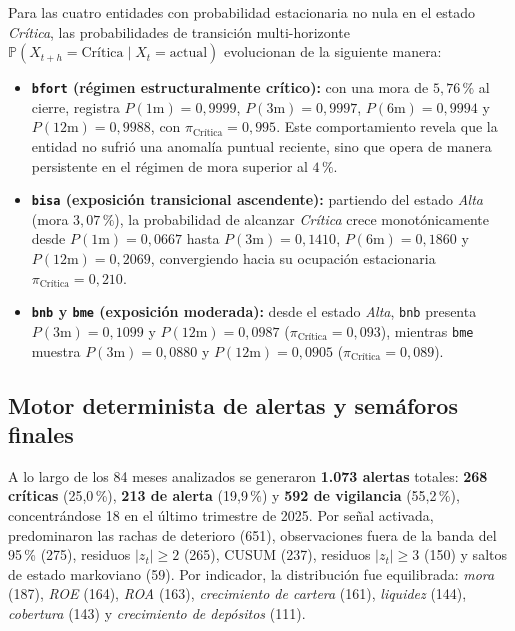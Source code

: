 \documentclass[11pt,letterpaper]{article}
\begin{document}
Para las cuatro entidades con probabilidad estacionaria no nula en el estado \emph{Crítica}, las probabilidades de transición multi-horizonte \(\mathbb{P}(X_{t+h} = \text{Crítica} \mid X_t = \text{actual})\) evolucionan de la siguiente manera:
\begin{itemize}[leftmargin=1.5em]
  \item \textbf{\texttt{bfort} (régimen estructuralmente crítico):} con una mora de \(5{,}76\,\%\) al cierre, registra \(P(1\text{m}) = 0{,}9999\), \(P(3\text{m}) = 0{,}9997\), \(P(6\text{m}) = 0{,}9994\) y \(P(12\text{m}) = 0{,}9988\), con \(\pi_{\text{Crítica}} = 0{,}995\). Este comportamiento revela que la entidad no sufrió una anomalía puntual reciente, sino que opera de manera persistente en el régimen de mora superior al \(4\,\%\).
  \item \textbf{\texttt{bisa} (exposición transicional ascendente):} partiendo del estado \emph{Alta} (mora \(3{,}07\,\%\)), la probabilidad de alcanzar \emph{Crítica} crece monotónicamente desde \(P(1\text{m}) = 0{,}0667\) hasta \(P(3\text{m}) = 0{,}1410\), \(P(6\text{m}) = 0{,}1860\) y \(P(12\text{m}) = 0{,}2069\), convergiendo hacia su ocupación estacionaria \(\pi_{\text{Crítica}} = 0{,}210\).
  \item \textbf{\texttt{bnb} y \texttt{bme} (exposición moderada):} desde el estado \emph{Alta}, \texttt{bnb} presenta \(P(3\text{m}) = 0{,}1099\) y \(P(12\text{m}) = 0{,}0987\) (\(\pi_{\text{Crítica}} = 0{,}093\)), mientras \texttt{bme} muestra \(P(3\text{m}) = 0{,}0880\) y \(P(12\text{m}) = 0{,}0905\) (\(\pi_{\text{Crítica}} = 0{,}089\)).
\end{itemize}

\subsection{Motor determinista de alertas y semáforos finales}

A lo largo de los 84 meses analizados se generaron \textbf{1.073 alertas} totales: \textbf{268 críticas} (25{,}0\,\%), \textbf{213 de alerta} (19{,}9\,\%) y \textbf{592 de vigilancia} (55{,}2\,\%), concentrándose 18 en el último trimestre de 2025. Por señal activada, predominaron las rachas de deterioro (651), observaciones fuera de la banda del 95\,\% (275), residuos \(|z_t| \ge 2\) (265), CUSUM (237), residuos \(|z_t| \ge 3\) (150) y saltos de estado markoviano (59). Por indicador, la distribución fue equilibrada: \emph{mora} (187), \emph{ROE} (164), \emph{ROA} (163), \emph{crecimiento de cartera} (161), \emph{liquidez} (144), \emph{cobertura} (143) y \emph{crecimiento de depósitos} (111).
\end{document}
